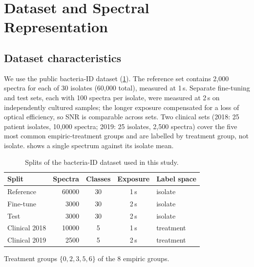 \documentclass[journal,onecolumn]{IEEEtran}
\newcommand{\sunit}[1]{#1\,s}             %
\begin{document}
\section{Dataset and Spectral Representation}
\label{sec:data}

\subsection{Dataset characteristics}
We use the public bacteria-ID dataset \cite{ho2019rapid}
(\cref{tab:dataset}). The reference set contains 2{,}000 spectra for each
of 30 isolates (60{,}000 total), measured at \sunit{1}. Separate
fine-tuning and test sets, each with 100 spectra per isolate, were
measured at \sunit{2} on independently cultured samples; the longer
exposure compensated for a loss of optical efficiency, so SNR is
comparable across sets. Two clinical sets (2018: 25 patient isolates,
10{,}000 spectra; 2019: 25 isolates, 2{,}500 spectra) cover the five most
common empiric-treatment groups and are labelled by treatment group, not
isolate.  shows a single spectrum against its isolate
mean.

\begin{table}[!t]
  \centering
  \caption{Splits of the bacteria-ID dataset used in this study.}
  \label{tab:dataset}
  \begin{threeparttable}
  \begin{tabular}{@{}l r c c l@{}}
    \toprule
    Split & {Spectra} & Classes & Exposure & Label space \\
    \midrule
    Reference      & 60000 & 30 & \sunit{1} & isolate \\
    Fine-tune      &  3000 & 30 & \sunit{2} & isolate \\
    Test           &  3000 & 30 & \sunit{2} & isolate \\
    Clinical 2018  & 10000 &  5\tnote{a} & \sunit{1} & treatment \\
    Clinical 2019  &  2500 &  5\tnote{a} & \sunit{2} & treatment \\
    \bottomrule
  \end{tabular}
  \begin{tablenotes}\footnotesize
    \item[a] Treatment groups $\{0,2,3,5,6\}$ of the 8 empiric groups.
  \end{tablenotes}
  \end{threeparttable}
\end{table}
\end{document}
